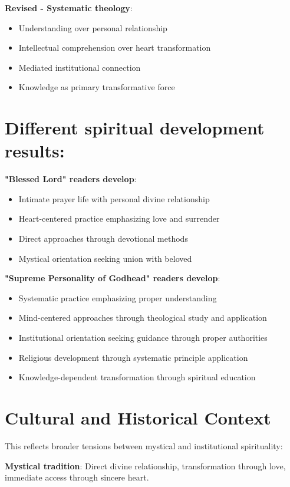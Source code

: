\documentclass[11pt,twoside]{book}
\begin{document}
\textbf{\textbf{Revised - Systematic theology}}:
\begin{itemize}
\item Understanding over personal relationship
\item Intellectual comprehension over heart transformation
\item Mediated institutional connection
\item Knowledge as primary transformative force
\end{itemize}
\section*{\textbf{\textbf{Different spiritual development results:}}}
\label{sec:orgdf1ae9c}

\textbf{\textbf{"Blessed Lord" readers develop}}:
\begin{itemize}
\item Intimate prayer life with personal divine relationship
\item Heart-centered practice emphasizing love and surrender
\item Direct approaches through devotional methods
\item Mystical orientation seeking union with beloved
\end{itemize}

\textbf{\textbf{"Supreme Personality of Godhead" readers develop}}:
\begin{itemize}
\item Systematic practice emphasizing proper understanding
\item Mind-centered approaches through theological study and application
\item Institutional orientation seeking guidance through proper authorities
\item Religious development through systematic principle application
\item Knowledge-dependent transformation through spiritual education
\end{itemize}
\section*{Cultural and Historical Context}
\label{sec:org4061572}

This reflects broader tensions between mystical and institutional spirituality:

\textbf{\textbf{Mystical tradition}}: Direct divine relationship, transformation through love, immediate access through sincere heart.
\end{document}
